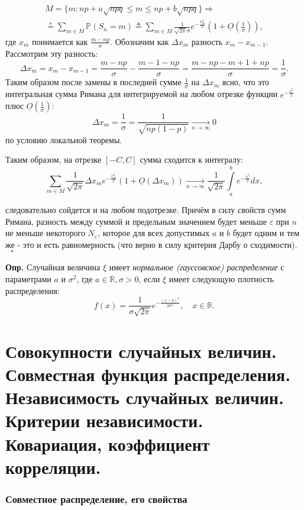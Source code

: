 \documentclass[oneside,final,14pt]{extreport}
\newcommand\mydef{{\bf Опр.}}
\theoremstyle{definition}
\begin{document}
$$\begin{array}{c}
M=\{m: n p+a \sqrt{n p q} \leqslant m \leqslant n p+b \sqrt{n p q}\} \Rightarrow \\
\stackrel{*}{=} \sum\limits_{m \in M} \mathbb{P}\left(S_{n}=m\right) \triangleq \sum_{m \in M} \frac{1}{\sqrt{2 \pi} \sigma} e^{-\frac{x_{m}^{2}}{2}}\left(1+\underline{O}\left(\frac{1}{\sigma}\right)\right),
\end{array}$$
где $x_m$ понимается как $\frac{m - np}{\sigma}.$ Обозначим как $\Delta x_{m}$ разность $x_m - x_{m-1}.$ Рассмотрим эту разность:
$$\Delta x_{m}=x_{m}-x_{m-1}=\frac{m-n p}{\sigma}-\frac{m-1-n p}{\sigma}=\frac{m-n p-m+1+n p}{\sigma}=\frac{1}{\sigma}.$$
Таким образом после замены в последней сумме $\frac{1}{\sigma}$ на $\Delta x_m$ ясно, что это интегральная сумма Римана для интегрируемой на любом отрезке функции $e^{-\frac{x^2}{2}}$ плюс $\underline{O}\left(\frac{1}{\sigma}\right)$:
$$\Delta x_{m}=\frac{1}{\sigma}=\frac{1}{\sqrt{n p(1-p)}} \underset{n \to \infty}{\longrightarrow} 0$$ по условию локальной теоремы.

Таким образом, на отрезке $[-C,C]$ сумма сходится к интегралу:
$$\sum_{m \in M} \frac{1}{\sqrt{2 \pi}} \Delta x_{m} e^{-\frac{x_{m}^{2}}{2}}\left(1+\underline{O}\left(\Delta x_{m}\right)\right) \underset{n \to \infty}{\longrightarrow} \frac{1}{\sqrt{2 \pi}} \int\limits_{a}^{b} e^{-\frac{x^{2}}{2}} d x,$$

следовательно сойдется и на любом подотрезке. Причём в
силу свойств сумм Римана, разность между суммой и предельным значением будет
меньше $\varepsilon$ при $n$ не меньше некоторого $N_\varepsilon$, которое для всех допустимых $a$ и $b$ будет одним и тем же - это и есть равномерность (что верно в силу критерия Дарбу о сходимости). $~~~ \square$

\mydef{} Случайная величина $\xi$ имеет {\it нормальное (гауссовское) распределение} с параметрами $a$ и $\sigma^2$, где $a \in \mathbb{R}, \sigma > 0$, если $\xi$ имеет следующую плотность распределения: 
$$f(x)=\frac{1}{\sigma \sqrt{2 \pi}} e^{-\frac{(x-a)^{2}}{2 \sigma^{2}}}, \quad x \in \mathbb{R}.$$

\section{Совокупности случайных величин. Совместная функция распределения. Независимость случайных величин. Критерии независимости. Ковариация, коэффициент корреляции.}

\subsubsection{Совместное распределение, его свойства}
\end{document}
